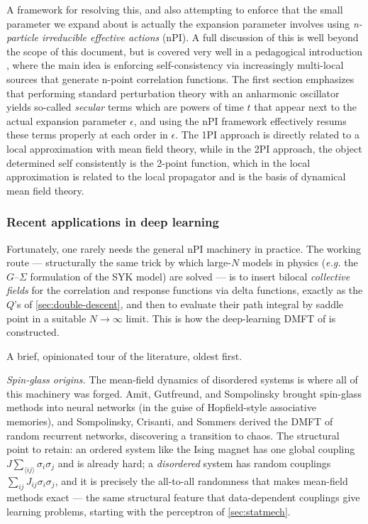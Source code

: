 \documentclass[11pt]{article}
\newcommand{\fixme}[1]{\textcolor{blue}{[#1]}}
\begin{document}
A framework for resolving this, and also attempting to enforce that the small parameter we expand about is actually the expansion parameter involves using \textit{n-particle irreducible effective actions} (nPI).  A full discussion of this is well beyond the scope of this document, but is covered very well in a pedagogical introduction \cite{bergesIntroductionNonequilibriumQuantum2004}, where the main idea is enforcing self-consistency via increasingly multi-local sources that generate n-point correlation functions.  The first section emphasizes that performing standard perturbation theory with an anharmonic oscillator yields so-called \textit{secular} terms which are powers of time $t$ that appear next to the actual expansion parameter $\epsilon$, and using the nPI framework effectively resums these terms properly at each order in $\epsilon$.  The 1PI approach is directly related to a local approximation with mean field theory, while in the 2PI approach, the object determined self consistently is the 2-point function, which in the local approximation is related to the local propagator and is the basis of dynamical mean field theory. 

\subsubsection{Recent applications in deep learning}

Fortunately, one rarely needs the general nPI machinery in practice. The working route --- structurally the same trick by which large-$N$ models in physics (\emph{e.g.} the $G$--$\Sigma$ formulation of the SYK model) are solved --- is to insert bilocal \emph{collective fields} for the correlation and response functions via delta functions, exactly as the $Q$'s of \cref{sec:double-descent}, and then to evaluate their path integral by saddle point in a suitable $N\to\infty$ limit. This is how the deep-learning DMFT of \cite{bordelon2022self,bordelon2024dynamical} is constructed. %

A brief, opinionated tour of the literature, oldest first.

\emph{Spin-glass origins.} The mean-field dynamics of disordered systems is where all of this machinery was forged. Amit, Gutfreund, and Sompolinsky \cite{amitSpinglassModelsNeural1985} brought spin-glass methods into neural networks (in the guise of Hopfield-style associative memories), and Sompolinsky, Crisanti, and Sommers \cite{sompolinskyChaosRandomNeural1988} derived the DMFT of random recurrent networks, discovering a transition to chaos. The structural point to retain: an ordered system like the Ising magnet has one global coupling $J\sum_{\langle ij\rangle}\sigma_i\sigma_j$ and is already hard; a \emph{disordered} system has random couplings $\sum_{ij} J_{ij}\sigma_i\sigma_j$, and it is precisely the all-to-all randomness that makes mean-field methods exact --- the same structural feature that data-dependent couplings give learning problems, starting with the perceptron of \cref{sec:statmech}.
\end{document}
